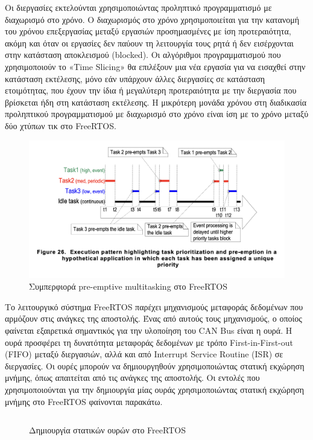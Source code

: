 \documentclass[a4paper,nobib,justified]{tufte-book}
\begin{document}
Οι διεργασίες εκτελούνται χρησιμοποιώντας προληπτικό προγραμματισμό με διαχωρισμό στο χρόνο. Ο διαχωρισμός στο χρόνο χρησιμοποιείται για την κατανομή του χρόνου επεξεργασίας μεταξύ εργασιών προσημασμένες με ίση προτεραιότητα, ακόμη και όταν οι εργασίες δεν παύουν τη λειτουργία τους ρητά ή δεν εισέρχονται στην κατάσταση αποκλεισμού (blocked). Οι αλγόριθμοι προγραμματισμού που χρησιμοποιούν το «Time Slicing» θα επιλέξουν μια νέα εργασία για να εισαχθεί στην κατάσταση εκτέλεσης, μόνο εάν υπάρχουν άλλες διεργασίες σε κατάσταση ετοιμότητας, που έχουν την ίδια ή μεγαλύτερη προτεραιότητα με την διεργασία που βρίσκεται ήδη στη κατάσταση εκτέλεσης. Η μικρότερη μονάδα χρόνου στη διαδικασία προληπτικού προγραμματισμού με διαχωρισμό στο χρόνο είναι ίση με το χρόνο μεταξύ δύο χτύπων τικ στο FreeRTOS.

\begin{figure}[ht]
	\includegraphics[width=0.8\linewidth]{media/diagrams/freeRTOS-preemptive-multitasking.png}
	\caption{Συμπερφιορά pre-emptive multitasking στο FreeRTOS}
	\label{fig:freeRTOS-preemptive-multitasking}
\end{figure}

Το λειτουργικό σύστημα FreeRTOS παρέχει μηχανισμούς μεταφοράς δεδομένων που αρμόζουν στις ανάγκες της αποστολής. Ένας από αυτούς τους μηχανισμούς, ο οποίος φαίνεται εξαιρετικά σημαντικός για την υλοποίηση του CAN Bus είναι η ουρά. Η ουρά προσφέρει τη δυνατότητα μεταφοράς δεδομένων με τρόπο First-in-First-out (FIFO) μεταξύ διεργασιών, αλλά και από Interrupt Service Routine (ISR) σε διεργασίες. Οι ουρές μπορούν να δημιουργηθούν χρησιμοποιώντας στατική εκχώρηση μνήμης, όπως απαιτείται από τις ανάγκες της αποστολής. Οι εντολές που χρησιμοποιούνται για την δημιουργία μίας ουράς χρησιμοποιώντας στατική εκχώρηση μνήμης στο FreeRTOS φαίνονται παρακάτω.

\begin{figure}
	\inputminted{c++}{code/examples/gatekeeper-queue.cpp}
	\label{code:gatekeeper-queue}
	\caption[Δημιουργία στατικών ουρών στο FreeRTOS]{Δημιουργία στατικών ουρών στο FreeRTOS}
\end{figure}
\end{document}

